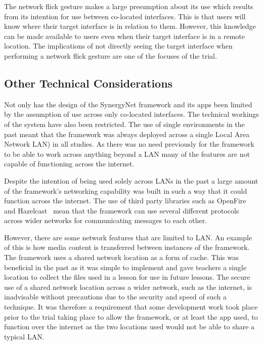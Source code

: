 \documentclass[a4paper,11pt]{article}
\begin{document}
The network flick gesture makes a large presumption about its use which results from its intention for use between co-located interfaces.
This is that users will know where their target interface is in relation to them.
However, this knowledge can be made available to users even when their target interface is in a remote location.
The implications of not directly seeing the target interface when performing a network flick gesture are one of the focuses of the trial.

\subsection{Other Technical Considerations}

Not only has the design of the SynergyNet framework and its apps been limited by the assumption of use across only co-located interfaces.
The technical workings of the system have also been restricted.
The use of single environments in the past meant that the framework was always deployed across a single Local Area Network LAN) in all studies.
As there was no need previously for the framework to be able to work across anything beyond a LAN many of the features are not capable of functioning across the internet.

Despite the intention of being used solely across LANs in the past a large amount of the framework's networking capability was built in such a way that it could function across the internet.
The use of third party libraries such as OpenFire~\cite{igniterealtime:2016} and Hazelcast~\cite{hazelcast:2016} mean that the framework can use several different protocols across wider networks for communicating messages to each other.

However, there are some network features that are limited to LAN.
An example of this is how media content is transferred between instances of the framework.
The framework uses a shared network location as a form of cache.
This was beneficial in the past as it was simple to implement and gave teachers a single location to collect the files used in a lesson for use in future lessons.
The secure use of a shared network location across a wider network, such as the internet, is inadvisable without precautions due to the security and speed of such a technique.
It was therefore a requirement that some development work took place prior to the trial taking place to allow the framework, or at least the app used, to function over the internet as the two locations used would not be able to share a typical LAN.
\end{document}
